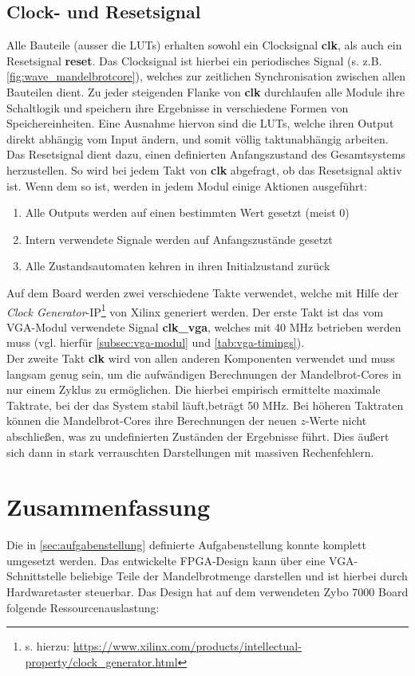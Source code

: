 \documentclass[a4paper,12pt,onesided]{report}
\begin{document}
\section{Clock- und Resetsignal}
Alle Bauteile (ausser die LUTs) erhalten sowohl ein Clocksignal \textbf{clk}, als auch ein Resetsignal \textbf{reset}.
Das Clocksignal ist hierbei ein periodisches Signal (s. z.B. \autoref{fig:wave_mandelbrotcore}), welches zur zeitlichen Synchronisation zwischen allen Bauteilen dient.
Zu jeder steigenden Flanke von \textbf{clk} durchlaufen alle Module ihre Schaltlogik und speichern ihre Ergebnisse in verschiedene Formen von Speichereinheiten.
Eine Ausnahme hiervon sind die LUTs, welche ihren Output direkt abhängig vom Input ändern, und somit völlig taktunabhängig arbeiten.\\
Das Resetsignal dient dazu, einen definierten Anfangszustand des Gesamtsystems herzustellen.
So wird bei jedem Takt von \textbf{clk} abgefragt, ob das Resetsignal aktiv ist.
Wenn dem so ist, werden in jedem Modul einige Aktionen ausgeführt:
\begin{enumerate}
	\item Alle Outputs werden auf einen bestimmten Wert gesetzt (meist 0)
	\item Intern verwendete Signale werden auf Anfangszustände gesetzt
	\item Alle Zustandsautomaten kehren in ihren Initialzustand zurück
\end{enumerate}
Auf dem Board werden zwei verschiedene Takte verwendet, welche mit Hilfe der \textit{Clock Generator}-IP\footnote{s. hierzu: \url{https://www.xilinx.com/products/intellectual-property/clock_generator.html}} von Xilinx generiert werden.
Der erste Takt ist das vom VGA-Modul verwendete Signal \textbf{clk\_vga}, welches mit 40 MHz betrieben werden muss (vgl. hierfür \autoref{subsec:vga-modul} und \autoref{tab:vga-timings}).\\
Der zweite Takt \textbf{clk} wird von allen anderen Komponenten verwendet und muss langsam genug sein, um die aufwändigen Berechnungen der Mandelbrot-Cores in nur einem Zyklus zu ermöglichen.
Die hierbei empirisch ermittelte maximale Taktrate, bei der das System stabil läuft,beträgt 50 MHz.
Bei höheren Taktraten können die Mandelbrot-Cores ihre Berechnungen der neuen $z$-Werte nicht abschließen, was zu undefinierten Zuständen der Ergebnisse führt.
Dies äußert sich dann in stark verrauschten Darstellungen mit massiven Rechenfehlern.

\chapter{Zusammenfassung}
Die in \autoref{sec:aufgabenstellung} definierte Aufgabenstellung konnte komplett umgesetzt werden.
Das entwickelte FPGA-Design kann über eine VGA-Schnittstelle beliebige Teile der Mandelbrotmenge darstellen und ist hierbei durch Hardwaretaster steuerbar.
Das Design hat auf dem verwendeten Zybo 7000 Board folgende Ressourcenauslastung:
\end{document}
